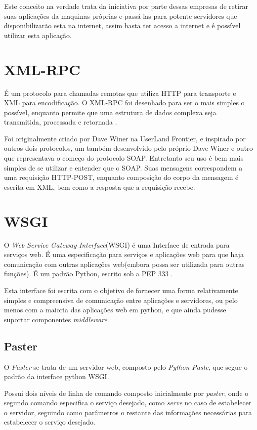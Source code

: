 Este conceito na verdade trata da iniciativa por parte dessas empresas de retirar suas aplicações da maquinas próprias e passá-las para potente servidores que disponibilizarão esta na internet, assim basta ter acesso a internet e é possível utilizar esta aplicação.

\section{XML-RPC}

É um protocolo para chamadas remotas que utiliza HTTP para transporte e XML para encodificação. O XML-RPC foi desenhado para ser o mais simples o possível, enquanto permite que uma estrutura de dados complexa seja transmitida, processada e retornada \cite{XMLRPC}.

Foi originalmente criado por Dave Winer na UserLand Frontier, e inspirado por outros dois protocolos, um também desenvolvido pelo próprio Dave Winer e outro que representava o começo do protocolo SOAP. Entretanto seu uso é bem mais simples de se utilizar e entender que o SOAP. Suas mensagens correspondem a uma requisição HTTP-POST, enquanto composição do corpo da mensagem é escrita em XML, bem como a resposta que a requisição recebe.

\section{WSGI}

O \textit{Web Service Gateway Interface}(WSGI) é uma Interface de entrada para serviços web. É uma especificação para serviços e aplicações web para que haja comunicação com outras aplicações web(embora possa ser utilizada para outras funções). É um padrão Python, escrito sob a PEP 333 \cite{WSGI}.

Esta interface foi escrita com o objetivo de fornecer uma forma relativamente simples e compreensiva de comunicação entre aplicações e servidores, ou pelo menos com a maioria das aplicações web em python, e que ainda pudesse suportar componentes \textit{middleware}.

\subsection{Paster}

O \textit{Paster} se trata de um servidor web, composto pelo \textit{Python Paste}, que segue o padrão da interface python WSGI.

Possui dois níveis de linha de comando composto inicialmente por \textit{paster}, onde o segundo comando especifica o serviço desejado, como \textit{serve} no caso de estabelecer o servidor, seguindo como parâmetros o restante das informações necessárias para estabelecer o serviço desejado.

